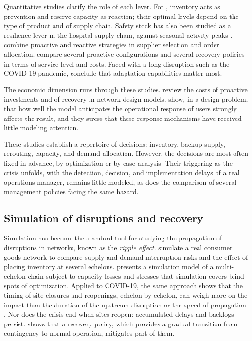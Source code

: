 Quantitative studies clarify the role of each lever. For \citet{lucker2019}, inventory acts as prevention and reserve capacity as reaction; their optimal levels depend on the type of product and of supply chain. Safety stock has also been studied as a resilience lever in the hospital supply chain, against seasonal activity peaks \citep{rahiel2025esd}. \citet{hosseini2019ijpe} combine proactive and reactive strategies in supplier selection and order allocation. \citet{ivanov2016tre} compare several proactive configurations and several recovery policies in terms of service level and costs. Faced with a long disruption such as the COVID-19 pandemic, \citet{ivanovdolgui2021ijpe} conclude that adaptation capabilities matter most.

The economic dimension runs through these studies. \citet{aldrighetti2021} review the costs of proactive investments and of recovery in network design models. \citet{klibi2012ijpe} show, in a design problem, that how well the model anticipates the operational response of users strongly affects the result, and they stress that these response mechanisms have received little modeling attention.

These studies establish a repertoire of decisions: inventory, backup supply, rerouting, capacity, and demand allocation. However, the decisions are most often fixed in advance, by optimization or by case analysis. Their triggering as the crisis unfolds, with the detection, decision, and implementation delays of a real operations manager, remains little modeled, as does the comparison of several management policies facing the same hazard.

\subsection{Simulation of disruptions and recovery}
\label{sec:ea-simulation}

Simulation has become the standard tool for studying the propagation of disruptions in networks, known as the \textit{ripple effect}. \citet{schmitt2012} simulate a real consumer goods network to compare supply and demand interruption risks and the effect of placing inventory at several echelons. \citet{ivanov2017} presents a simulation model of a multi-echelon chain subject to capacity losses and stresses that simulation covers blind spots of optimization. Applied to COVID-19, the same approach shows that the timing of site closures and reopenings, echelon by echelon, can weigh more on the impact than the duration of the upstream disruption or the speed of propagation \citep{ivanov2020}. Nor does the crisis end when sites reopen: accumulated delays and backlogs persist. \citet{ivanov2019cie} shows that a recovery policy, which provides a gradual transition from contingency to normal operation, mitigates part of them.


